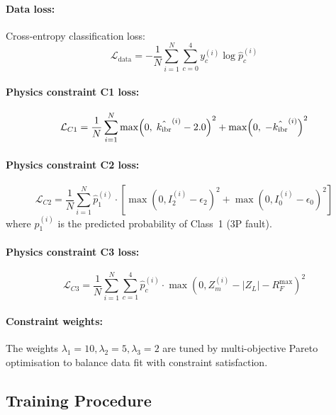 \paragraph{Data loss:} Cross-entropy classification loss:
\begin{equation}
  \mathcal{L}_\mathrm{data} = -\frac{1}{N}\sum_{i=1}^{N}
    \sum_{c=0}^{4} y_c^{(i)} \log \hat{p}_c^{(i)}
  \label{eq:ch8_data_loss}
\end{equation}

\paragraph{Physics constraint C1 loss:}
\begin{equation}
  \mathcal{L}_{C1} = \frac{1}{N}\sum_{i=1}^{N}
    \max\!\left(0,\; \hat{k_\mathrm{ibr}}^{(i)} - 2.0\right)^2
    + \max\!\left(0,\; -\hat{k_\mathrm{ibr}}^{(i)}\right)^2
  \label{eq:ch8_c1_loss}
\end{equation}

\paragraph{Physics constraint C2 loss:}
\begin{equation}
  \mathcal{L}_{C2} = \frac{1}{N}\sum_{i=1}^{N}
    \hat{p}_1^{(i)} \cdot \left[\max(0, I_2^{(i)} - \epsilon_2)^2
      + \max(0, I_0^{(i)} - \epsilon_0)^2\right]
  \label{eq:ch8_c2_loss}
\end{equation}
where $\hat{p}_1^{(i)}$ is the predicted probability of Class~1 (3P fault).

\paragraph{Physics constraint C3 loss:}
\begin{equation}
  \mathcal{L}_{C3} = \frac{1}{N}\sum_{i=1}^{N}
    \sum_{c=1}^{4} \hat{p}_c^{(i)} \cdot
    \max(0, Z_m^{(i)} - |Z_L| - R_F^\mathrm{max})^2
  \label{eq:ch8_c3_loss}
\end{equation}

\paragraph{Constraint weights:}
The weights $\lambda_1 = 10, \lambda_2 = 5, \lambda_3 = 2$ are tuned
by multi-objective Pareto optimisation to balance data fit with
constraint satisfaction.

\subsection{Training Procedure}

